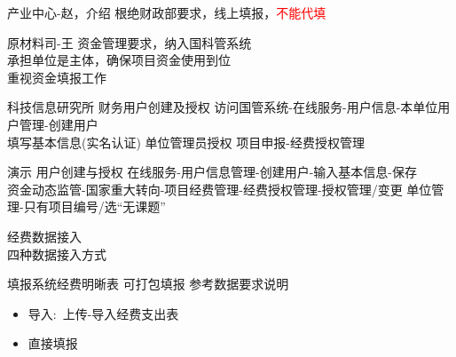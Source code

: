 产业中心-赵，介绍
根绝财政部要求，线上填报，\textcolor{red}{不能代填}

原材料司-王
资金管理要求，纳入国科管系统\\
承担单位是主体，确保项目资金使用到位\\
重视资金填报工作

科技信息研究所
财务用户创建及授权
访问国管系统-在线服务-用户信息-本单位用户管理-创建用户\\
填写基本信息(实名认证)
单位管理员授权
项目申报-经费授权管理

演示
用户创建与授权
在线服务-用户信息管理-创建用户-输入基本信息-保存\\
资金动态监管-国家重大转向-项目经费管理-经费授权管理-授权管理/变更
单位管理-只有项目编号/选``无课题''

经费数据接入\\
四种数据接入方式

填报系统经费明晰表
可打包填报
参考数据要求说明

\begin{itemize}
	\item 导入:~上传-导入经费支出表

	\item 直接填报
\end{itemize}
